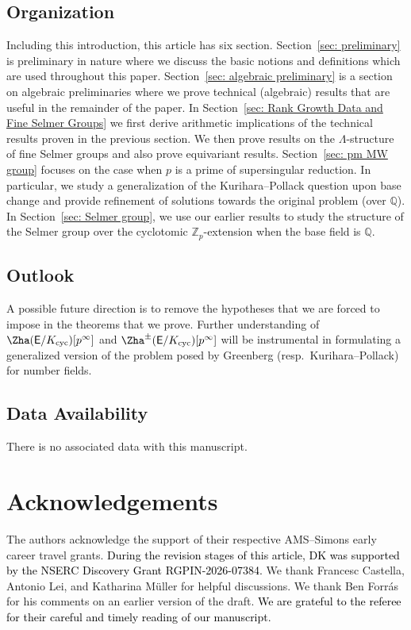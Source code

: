 \documentclass{amsart}
\newcommand{\edit}[1]{\textcolor{black}{#1}}
\numberwithin{equation}{section}
\theoremstyle{remark}
\newcommand{\EC}{\mathsf{E}}
\newcommand{\Zp}{\mathbb{Z}_p}
\newcommand{\Q}{\mathbb{Q}}
\newcommand{\cyc}{\operatorname{{cyc}}}
\theoremstyle{plain} %
\begin{document}
\subsection*{Organization}
Including this introduction, this article has six section.
Section~\ref{sec: preliminary} is preliminary in nature where we discuss the basic notions and definitions which are used throughout this paper.
Section~\ref{sec: algebraic preliminary} is a section on algebraic preliminaries where we prove technical (algebraic) results that are useful in the remainder of the paper.
In Section~\ref{sec: Rank Growth Data and Fine Selmer Groups} we first derive arithmetic implications of the technical results proven in the previous section.
We then prove results on the $\Lambda$-structure of fine Selmer groups and also prove equivariant results.
Section~\ref{sec: pm MW group} focuses on the case when $p$ is a prime of supersingular reduction.
In particular, we study a generalization of the Kurihara--Pollack question upon base change and provide refinement of solutions towards the original problem (over $\Q$).
In Section~\ref{sec: Selmer group}, we use our earlier results to study the structure of the Selmer group over the cyclotomic $\Zp$-extension when the base field is $\Q$.



\subsection*{Outlook}
A possible future direction is to remove the hypotheses that we are forced to impose in the theorems that we prove.
Further understanding of $\Zha(\EC/K_{\cyc})[p^\infty]$ and $\Zha^{\pm}(\EC/K_{\cyc})[p^\infty]$ will be instrumental in formulating a generalized version of the problem posed by Greenberg (resp.~Kurihara--Pollack) for number fields.


\subsection*{Data Availability} There is no associated data with this manuscript.

\section*{Acknowledgements}
The authors acknowledge the support of their respective AMS--Simons early career travel grants.
\edit{During the revision stages of this article, DK was supported by the NSERC Discovery Grant RGPIN-2026-07384.}
We thank Francesc Castella, Antonio Lei, and Katharina M{\"u}ller for helpful discussions.
We thank Ben Forrás for his comments on an earlier version of the draft.
\edit{We are grateful to the referee for their careful and timely reading of our manuscript.}
\end{document}
